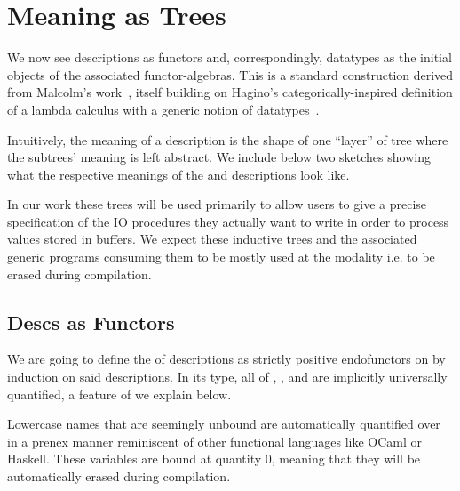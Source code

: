 \section{Meaning as Trees}\label{sec:trees}

We now see descriptions as functors and, correspondingly,
datatypes as the initial objects of the associated functor-algebras.
%
This is a standard construction derived from Malcolm's
work~\citeyearpar{DBLP:journals/scp/Malcolm90},
itself building on Hagino's categorically-inspired
definition of a lambda calculus
with a generic notion of datatypes~\citep{DBLP:conf/ctcs/Hagino87}.

Intuitively, the meaning of a description is the shape of one ``layer'' of
tree where the subtrees' meaning is left abstract. We include below two
sketches showing what the respective meanings of the 
and  descriptions look like.

\noindent
\begin{center}
\scalebox{.8}{}
\end{center}

In our work these trees will be used primarily to allow users to
give a precise specification of the IO procedures they actually want
to write in order to process values stored in buffers.
%
We expect these inductive trees and the associated generic programs
consuming them to be mostly used at the 
modality i.e. to be erased during compilation.

\subsection{Descs as Functors}

We are going to define the  of descriptions
as strictly positive endofunctors on  by
induction on said descriptions.
%
In its type, all of , ,
and  are implicitly universally quantified,
a feature of \idris{} we explain below.


\begin{remark}\label{rmk:prenexpoly}
  Lowercase names that are seemingly unbound are automatically
  quantified over in a prenex manner reminiscent of other functional
  languages like OCaml or Haskell.
  These variables are bound at quantity 0, meaning that they will
  be automatically erased during compilation.
\end{remark}


